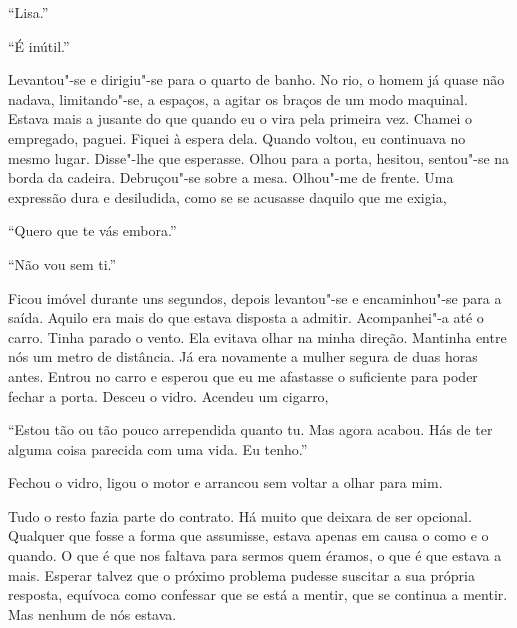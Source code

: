 ``Lisa.''

``É inútil.''

Levantou"-se e dirigiu"-se para o quarto de banho. No rio, o homem já
quase não nadava, limitando"-se, a espaços, a agitar os braços de um
modo maquinal. Estava mais a jusante do que quando eu o vira pela
primeira vez. Chamei o empregado, paguei. Fiquei à espera dela. Quando
voltou, eu continuava no mesmo lugar. Disse"-lhe que esperasse. Olhou
para a porta, hesitou, sentou"-se na borda da cadeira. Debruçou"-se
sobre a mesa. Olhou"-me de frente. Uma expressão dura e desiludida, como
se se acusasse daquilo que me exigia,

``Quero que te vás embora.''

``Não vou sem ti.''

Ficou imóvel durante uns segundos, depois levantou"-se e encaminhou"-se
para a saída. Aquilo era mais do que estava disposta a admitir.
Acompanhei"-a até o carro. Tinha parado o vento. Ela evitava olhar na
minha direção. Mantinha entre nós um metro de distância. Já era
novamente a mulher segura de duas horas antes. Entrou no carro e esperou
que eu me afastasse o suficiente para poder fechar a porta. Desceu o
vidro. Acendeu um cigarro,

``Estou tão ou tão pouco arrependida quanto tu. Mas agora acabou. Hás de
ter alguma coisa parecida com uma vida. Eu tenho.''

Fechou o vidro, ligou o motor e arrancou sem voltar a olhar para mim.

Tudo o resto fazia parte do contrato. Há muito que deixara de ser
opcional. Qualquer que fosse a forma que assumisse, estava apenas em
causa o como e o quando. O que é que nos faltava para sermos quem
éramos, o que é que estava a mais. Esperar talvez que o próximo problema
pudesse suscitar a sua própria resposta, equívoca como confessar que se
está a mentir, que se continua a mentir. Mas nenhum de nós estava.

